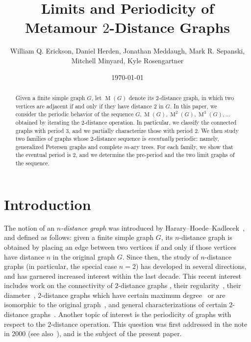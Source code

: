 \documentclass[12pt]{amsart}
\title[$2$-Distance Graphs]{Limits and Periodicity of Metamour $2$-Distance Graphs}
\author[Erickson, Herden, Meddaugh, Sepanski, $\ldots$]{William Q. Erickson, Daniel Herden, Jonathan Meddaugh, Mark R. Sepanski, Mitchell Minyard, Kyle Rosengartner}
\date{\today}
\theoremstyle{definition}
\theoremstyle{remark}
\numberwithin{equation}{section}
\numberwithin{figure}{section}
\newcommand{\M}{\operatorname{M}}
\begin{document}

\begin{abstract}
    Given a finite simple graph $G$, let $\M(G)$ denote its 2-distance graph, in which two vertices are adjacent if and only if they have distance 2 in $G$.  
    In this paper, we consider the periodic behavior of the sequence $G, \M(G), \M^2(G), \M^3(G), \ldots$ obtained by iterating the 2-distance operation.
    In particular, we classify the connected graphs with period 3, and we partially characterize those with period 2.
    We then study two families of graphs whose 2-distance sequence is \emph{eventually} periodic: namely, generalized Petersen graphs and complete $m$-ary trees.
    For each family, we show that the eventual period is 2, and we determine the pre-period and the two limit graphs of the sequence.
\end{abstract}

\maketitle

\tableofcontents

\section{Introduction}

The notion of an \emph{$n$-distance graph} was introduced by Harary--Hoede--Kadlecek~\cite{HHK}, and defined as follows: given a finite simple graph $G$, its $n$-distance graph is obtained by placing an edge between two vertices if and only if those vertices have distance $n$ in the original graph $G$.
Since then, the study of $n$-distance graphs (in particular, the special case $n=2$) has developed in several directions, and has garnered increased interest within the last decade.
This recent interest includes work on the connectivity of $2$-distance graphs \cite{JM23, Khormali}, their regularity~\cite{GaarKrenn2023}, their diameter~\cite{JM24}, $2$-distance graphs which have certain maximum degree~\cite{AG1} or are isomorphic to the original graph~\cite{AG2}, and general characterizations of certain $2$-distance graphs~\cite{ChingGarces19}.
Another topic of interest is the periodicity of graphs with respect to the $2$-distance operation.
This question was first addressed in the note~\cite{Zelinka} in 2000 (see also~\cite{Leonor}), and is the subject of the present paper.
\end{document}
